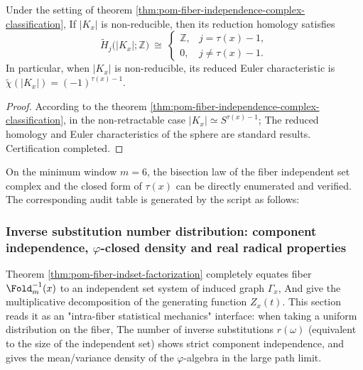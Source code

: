 \begin{corollary}\label{cor:pom-fiber-independence-complex-homology}
Under the setting of theorem \ref{thm:pom-fiber-independence-complex-classification},
If \(|K_x|\) is non-reducible, then its reduction homology satisfies
\[
\widetilde H_j\bigl(|K_x|;\mathbb Z\bigr)\ \cong\
\begin{cases}
\mathbb Z,& j=\tau(x)-1,\\
0,& j\neq \tau(x)-1.
\end{cases}
\]
In particular, when \(|K_x|\) is non-reducible, its reduced Euler characteristic is \(\widetilde\chi(|K_x|)=(-1)^{\tau(x)-1}\).
\end{corollary}
\begin{proof}
According to the theorem \ref{thm:pom-fiber-independence-complex-classification}, in the non-retractable case \(|K_x|\simeq S^{\tau(x)-1}\);
The reduced homology and Euler characteristics of the sphere are standard results. Certification completed.
\end{proof}

\begin{remark}\label{rem:pom-fiber-indcomplex-audit-m6}
On the minimum window \(m=6\), the bisection law of the fiber independent set complex and the closed form of \(\tau(x)\) can be directly enumerated and verified.
The corresponding audit table is generated by the script as follows:

\end{remark}

\subsubsection{Inverse substitution number distribution: component independence, \texorpdfstring{$\varphi$}{phi}-closed density and real radical properties}\label{subsubsec:pom-fiber-rewrite-statistics}

Theorem \ref{thm:pom-fiber-indset-factorization} completely equates fiber \(\Fold_m^{-1}(x)\) to an independent set system of induced graph \(\Gamma_x\),
And give the multiplicative decomposition of the generating function \(Z_x(t)\).
This section reads it as an "intra-fiber statistical mechanics" interface: when taking a uniform distribution on the fiber,
The number of inverse substitutions \(r(\omega)\) (equivalent to the size of the independent set) shows strict component independence,
and gives the mean/variance density of the \(\varphi\)-algebra in the large path limit.

